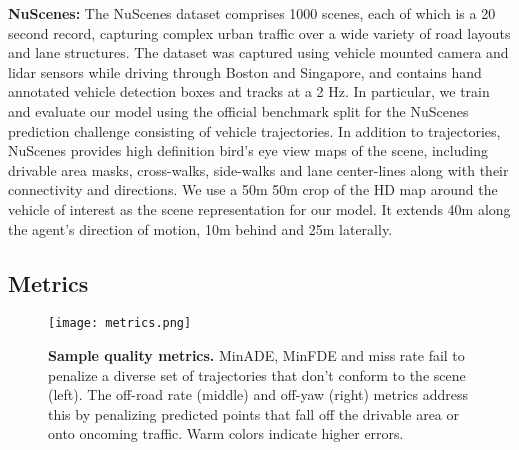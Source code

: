 \documentclass[journal]{IEEEtran}
\begin{document}
\vspace{0.1in}
\noindent \textbf{NuScenes:} 
The NuScenes dataset \cite{caesar2020nuscenes} comprises 1000 scenes, each of which is a 20 second record, capturing complex urban traffic over a wide variety of road layouts and lane structures. The dataset was captured using vehicle mounted camera and lidar sensors while driving through Boston and Singapore, and contains hand annotated vehicle detection boxes and tracks at a 2 Hz. In particular, we train and evaluate our model using the official benchmark split for the NuScenes prediction challenge consisting of vehicle trajectories. In addition to trajectories, NuScenes provides high definition bird's eye view maps of the scene, including drivable area masks, cross-walks, side-walks and lane center-lines along with their connectivity and directions. We use a 50m  50m crop of the HD map around the vehicle of interest as the scene representation for our model. It extends 40m along the agent's direction of motion, 10m behind and  25m laterally.       






































\subsection{Metrics}



\begin{figure}[t]
\centering
\texttt{[image: metrics.png]}
\caption{\textbf{Sample quality metrics.} MinADE, MinFDE and miss rate fail to penalize a diverse set of trajectories that don't conform to the scene (left). The off-road rate (middle) and off-yaw (right) metrics address this by penalizing predicted points that fall off the drivable area or onto oncoming traffic. Warm colors indicate higher errors.} 
\label{fig:metrics}
\end{figure}
\end{document}
